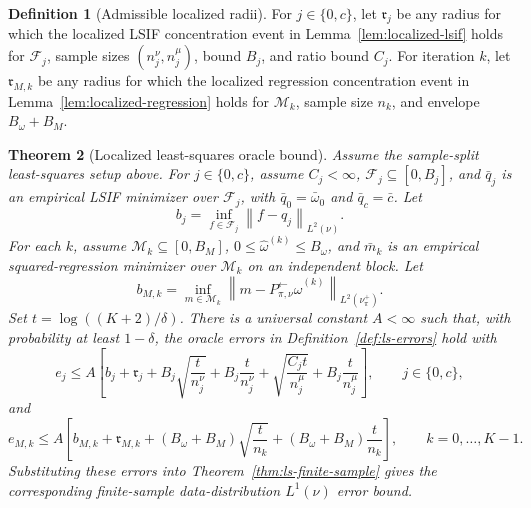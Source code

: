 \documentclass{article}
\newcommand{\sF}{\mathcal{F}}
\newcommand{\sM}{\mathcal{M}}
\newcommand{\1}{\mathbf{1}}
\newcommand{\Pback}{P_{\pi,\nu}^{\leftarrow}}
\newcommand{\Mpi}{\Pback}
\newcommand{\omegahat}{\widehat{\omega}}
\newcommand{\norm}[2][]{\left\lVert #2 \right\rVert_{#1}}
\newcommand{\LtwoNu}[1]{\norm[L^2(\nu)]{#1}}
\newcommand{\LtwoNuPlus}[1]{\norm[L^2(\nu_\pi^+)]{#1}}
\newcommand{\crit}{\mathfrak{r}}
\theoremstyle{plain}
\newtheorem{theorem}{Theorem}[section]
\theoremstyle{definition}
\newtheorem{definition}[theorem]{Definition}
\theoremstyle{remark}
\begin{document}
\begin{definition}[Admissible localized radii]
\label{def:critical-radii}
For $j\in\{0,c\}$, let $\crit_j$ be any radius for which the localized LSIF concentration event in Lemma~\ref{lem:localized-lsif} holds for $\sF_j$, sample sizes $(n_j^\nu,n_j^\mu)$, bound $B_j$, and ratio bound $C_j$.
For iteration $k$, let $\crit_{M,k}$ be any radius for which the localized regression concentration event in Lemma~\ref{lem:localized-regression} holds for $\sM_k$, sample size $n_k$, and envelope $B_\omega+B_M$.
\end{definition}

\begin{theorem}[Localized least-squares oracle bound]
\label{thm:localized-ls-oracle}
Assume the sample-split least-squares setup above.
For $j\in\{0,c\}$, assume $C_j<\infty$, $\sF_j\subseteq[0,B_j]$, and $\bar q_j$ is an empirical LSIF minimizer over $\sF_j$, with $\bar q_0=\bar\omega_0$ and $\bar q_c=\bar c$.
Let
\[
    b_j=\inf_{f\in\sF_j}\LtwoNu{f-q_j}.
\]
For each $k$, assume $\sM_k\subseteq[0,B_M]$, $0\le \omegahat^{(k)}\le B_\omega$, and $\bar m_k$ is an empirical squared-regression minimizer over $\sM_k$ on an independent block.
Let
\[
    b_{M,k}
    =
    \inf_{m\in\sM_k}
    \LtwoNuPlus{m-\Mpi\omegahat^{(k)}}.
\]
Set $t=\log((K+2)/\delta)$.
There is a universal constant $A<\infty$ such that, with probability at least $1-\delta$, the oracle errors in Definition~\ref{def:ls-errors} hold with
\[
    e_j
    \le
    A\left[
        b_j+\crit_j
        +B_j\sqrt{\frac{t}{n_j^\nu}}
        +B_j\frac{t}{n_j^\nu}
        +\sqrt{\frac{C_jt}{n_j^\mu}}
        +B_j\frac{t}{n_j^\mu}
    \right],
    \qquad j\in\{0,c\},
\]
and
\[
    e_{M,k}
    \le
    A\left[
        b_{M,k}+\crit_{M,k}
        +(B_\omega+B_M)\sqrt{\frac{t}{n_k}}
        +(B_\omega+B_M)\frac{t}{n_k}
    \right],
    \qquad k=0,\ldots,K-1.
\]
Substituting these errors into Theorem~\ref{thm:ls-finite-sample} gives the corresponding finite-sample data-distribution $L^1(\nu)$ error bound.
\end{theorem}
\end{document}
